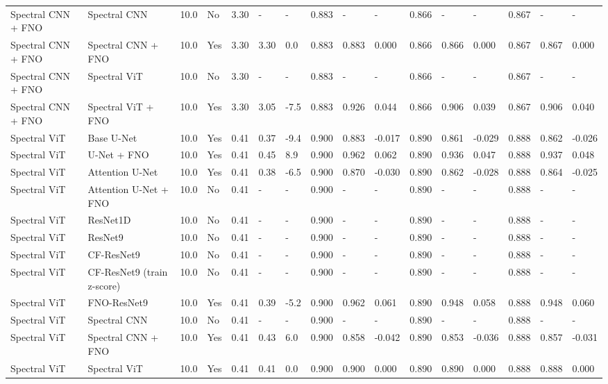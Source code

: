 \begin{longtable}{llllllllllllllll}
Spectral CNN + FNO & Spectral CNN & 10.0 & No & 3.30 & - & - & 0.883 & - & - & 0.866 & - & - & 0.867 & - & - \\
Spectral CNN + FNO & Spectral CNN + FNO & 10.0 & Yes & 3.30 & 3.30 & 0.0 & 0.883 & 0.883 & 0.000 & 0.866 & 0.866 & 0.000 & 0.867 & 0.867 & 0.000 \\
Spectral CNN + FNO & Spectral ViT & 10.0 & No & 3.30 & - & - & 0.883 & - & - & 0.866 & - & - & 0.867 & - & - \\
Spectral CNN + FNO & Spectral ViT + FNO & 10.0 & Yes & 3.30 & 3.05 & -7.5 & 0.883 & 0.926 & 0.044 & 0.866 & 0.906 & 0.039 & 0.867 & 0.906 & 0.040 \\
Spectral ViT & Base U-Net & 10.0 & Yes & 0.41 & 0.37 & -9.4 & 0.900 & 0.883 & -0.017 & 0.890 & 0.861 & -0.029 & 0.888 & 0.862 & -0.026 \\
Spectral ViT & U-Net + FNO & 10.0 & Yes & 0.41 & 0.45 & 8.9 & 0.900 & 0.962 & 0.062 & 0.890 & 0.936 & 0.047 & 0.888 & 0.937 & 0.048 \\
Spectral ViT & Attention U-Net & 10.0 & Yes & 0.41 & 0.38 & -6.5 & 0.900 & 0.870 & -0.030 & 0.890 & 0.862 & -0.028 & 0.888 & 0.864 & -0.025 \\
Spectral ViT & Attention U-Net + FNO & 10.0 & No & 0.41 & - & - & 0.900 & - & - & 0.890 & - & - & 0.888 & - & - \\
Spectral ViT & ResNet1D & 10.0 & No & 0.41 & - & - & 0.900 & - & - & 0.890 & - & - & 0.888 & - & - \\
Spectral ViT & ResNet9 & 10.0 & No & 0.41 & - & - & 0.900 & - & - & 0.890 & - & - & 0.888 & - & - \\
Spectral ViT & CF-ResNet9 & 10.0 & No & 0.41 & - & - & 0.900 & - & - & 0.890 & - & - & 0.888 & - & - \\
Spectral ViT & CF-ResNet9 (train z-score) & 10.0 & No & 0.41 & - & - & 0.900 & - & - & 0.890 & - & - & 0.888 & - & - \\
Spectral ViT & FNO-ResNet9 & 10.0 & Yes & 0.41 & 0.39 & -5.2 & 0.900 & 0.962 & 0.061 & 0.890 & 0.948 & 0.058 & 0.888 & 0.948 & 0.060 \\
Spectral ViT & Spectral CNN & 10.0 & No & 0.41 & - & - & 0.900 & - & - & 0.890 & - & - & 0.888 & - & - \\
Spectral ViT & Spectral CNN + FNO & 10.0 & Yes & 0.41 & 0.43 & 6.0 & 0.900 & 0.858 & -0.042 & 0.890 & 0.853 & -0.036 & 0.888 & 0.857 & -0.031 \\
Spectral ViT & Spectral ViT & 10.0 & Yes & 0.41 & 0.41 & 0.0 & 0.900 & 0.900 & 0.000 & 0.890 & 0.890 & 0.000 & 0.888 & 0.888 & 0.000 \\

\end{longtable}
